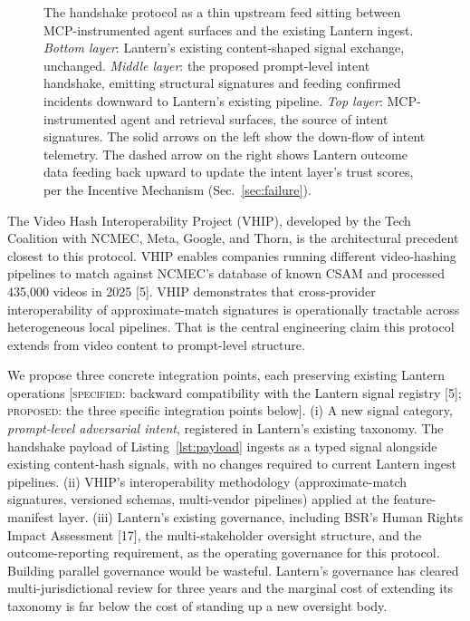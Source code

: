 \documentclass[11pt]{article}
\begin{document}
\begin{figure}[!htbp]
\begin{tikzpicture}
\end{tikzpicture}
\caption{The handshake protocol as a thin upstream feed sitting between MCP-instrumented agent surfaces and the existing Lantern ingest. \emph{Bottom layer}: Lantern's existing content-shaped signal exchange, unchanged. \emph{Middle layer}: the proposed prompt-level intent handshake, emitting structural signatures and feeding confirmed incidents downward to Lantern's existing pipeline. \emph{Top layer}: MCP-instrumented agent and retrieval surfaces, the source of intent signatures. The solid arrows on the left show the down-flow of intent telemetry. The dashed arrow on the right shows Lantern outcome data feeding back upward to update the intent layer's trust scores, per the Incentive Mechanism (Sec.~\ref{sec:failure}).}
\label{fig:layerstack}
\end{figure}

The Video Hash Interoperability Project (VHIP), developed by the Tech Coalition with NCMEC, Meta, Google, and Thorn, is the architectural precedent closest to this protocol. VHIP enables companies running different video-hashing pipelines to match against NCMEC's database of known CSAM and processed 435{,}000 videos in 2025 [5]. VHIP demonstrates that cross-provider interoperability of approximate-match signatures is operationally tractable across heterogeneous local pipelines. That is the central engineering claim this protocol extends from video content to prompt-level structure.

We propose three concrete integration points, each preserving existing Lantern operations [\textsc{specified}: backward compatibility with the Lantern signal registry [5]; \textsc{proposed}: the three specific integration points below]. (i) A new signal category, \emph{prompt-level adversarial intent}, registered in Lantern's existing taxonomy. The handshake payload of Listing~\ref{lst:payload} ingests as a typed signal alongside existing content-hash signals, with no changes required to current Lantern ingest pipelines. (ii) VHIP's interoperability methodology (approximate-match signatures, versioned schemas, multi-vendor pipelines) applied at the feature-manifest layer. (iii) Lantern's existing governance, including BSR's Human Rights Impact Assessment [17], the multi-stakeholder oversight structure, and the outcome-reporting requirement, as the operating governance for this protocol. Building parallel governance would be wasteful. Lantern's governance has cleared multi-jurisdictional review for three years and the marginal cost of extending its taxonomy is far below the cost of standing up a new oversight body.
\end{document}
